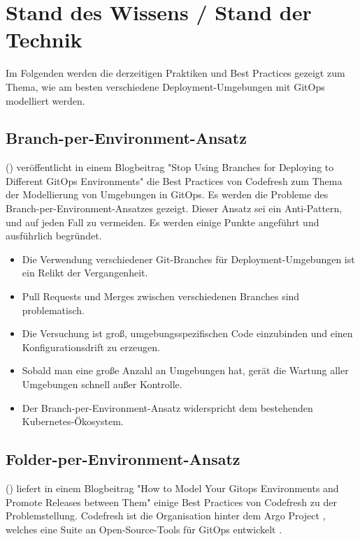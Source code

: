 \chapter{Stand des Wissens / Stand der Technik}

Im Folgenden werden die derzeitigen Praktiken und Best Practices
gezeigt zum Thema,
wie am besten verschiedene Deployment-Umgebungen mit GitOps modelliert werden.


\section{Branch-per-Environment-Ansatz}

\citeauthor{codefreshStopUsingBranchesGitOpsEnvironments} (\citeyear{codefreshStopUsingBranchesGitOpsEnvironments})
veröffentlicht in einem Blogbeitrag "Stop Using Branches for Deploying to Different GitOps Environments"
die Best Practices von Codefresh zum Thema der Modellierung von Umgebungen in GitOps.
Es werden die Probleme des Branch-per-Environment-Ansatzes gezeigt.
Dieser Ansatz sei ein Anti-Pattern,
und auf jeden Fall zu vermeiden.
Es werden einige Punkte angeführt und ausführlich begründet.

\begin{itemize}
	\item Die Verwendung verschiedener Git-Branches für Deployment-Umgebungen ist ein Relikt der Vergangenheit.
	\item Pull Requests und Merges zwischen verschiedenen Branches sind problematisch.
	\item Die Versuchung ist groß, umgebungsspezifischen Code einzubinden und einen Konfigurationsdrift zu erzeugen.
	\item Sobald man eine große Anzahl an Umgebungen hat, gerät die Wartung aller Umgebungen schnell außer Kontrolle.
	\item Der Branch-per-Environment-Ansatz widerspricht dem bestehenden Kubernetes-Ökosystem.
\end{itemize}


\section{Folder-per-Environment-Ansatz}

\citeauthor{codefreshHowToModelGitOpsEnvironmentsAndPromote} (\citeyear{codefreshHowToModelGitOpsEnvironmentsAndPromote})
liefert in einem Blogbeitrag
"How to Model Your Gitops Environments and Promote Releases between Them"
einige Best Practices von Codefresh zu der Problemstellung.
Codefresh ist die Organisation hinter dem Argo Project
\autocite{argoProjWebsite},
welches eine Suite an Open-Source-Tools für GitOps
entwickelt
\autocite{codefreshHowToModelGitOpsEnvironmentsAndPromote}.

